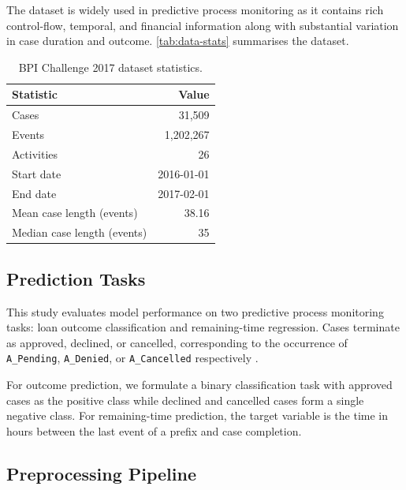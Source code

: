 \documentclass[runningheads]{llncs}
\begin{document}
The dataset is widely used in predictive process monitoring as it contains rich control-flow, temporal, and financial information along with substantial variation in case duration and outcome. \autoref{tab:data-stats} summarises the dataset.

\begin{table}[t]
    \centering
    \caption{BPI Challenge 2017 dataset statistics.}
    \label{tab:data-stats}
    \begin{tabular}{lr}
        \toprule
        Statistic & Value \\
        \midrule
        Cases                        & 31{,}509 \\
        Events                       & 1{,}202{,}267 \\
        Activities                   & 26 \\
        \midrule
        Start date                   & 2016-01-01 \\
        End date                     & 2017-02-01 \\
        \midrule
        Mean case length (events)    & 38.16 \\
        Median case length (events)  & 35 \\
        \bottomrule
    \end{tabular}
\end{table}


\subsection{Prediction Tasks}
This study evaluates model performance on two predictive process monitoring tasks: loan outcome classification and remaining-time regression. Cases terminate as approved, declined, or cancelled, corresponding to the
occurrence of \texttt{A\_Pending}, \texttt{A\_Denied}, or \texttt{A\_Cancelled} respectively \cite{povalyaeva2017bpic}. 

For outcome prediction, we formulate a binary classification task with approved cases as the positive class while declined and cancelled cases form a single negative class. For remaining-time prediction, the target variable is the time in hours between the last event of a prefix and case completion.

\subsection{Preprocessing Pipeline}
\label{sec:preprocessing}
\end{document}
